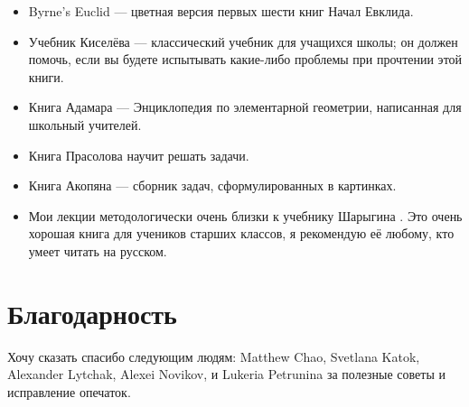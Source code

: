 \begin{itemize}
\item Byrne's Euclid \cite{byrne} --- цветная версия первых шести книг Начал Евклида. 

\item Учебник Киселёва \cite{kiselev} ---
классический учебник для учащихся школы; он должен помочь, если вы будете испытывать какие-либо проблемы при прочтении этой книги.

\item Книга Адамара \cite{hadamard} --- Энциклопедия по элементарной геометрии, написанная для школьный учителей.



\item Книга Прасолова \cite{prasolov} научит решать задачи.

\item Книга Акопяна \cite{akopyan} --- сборник задач, сформулированных в картинках.

\item Мои лекции методологически 
очень близки к учебнику Шарыгина \cite{sharygin}.
Это очень хорошая книга для учеников старших классов,
я рекомендую её любому, кто умеет читать на русском.


\end{itemize}

\section*{Благодарность}

Хочу сказать спасибо следующим людям: 
Matthew Chao, 
Svetlana Katok, 
Alexander Lytchak,
Alexei Novi\-kov,
и Lukeria Petrunina
за полезные советы и исправление опечаток.






